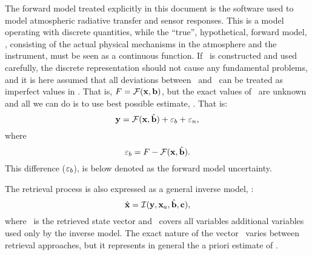 The forward model treated explicitly in this document is the software used to
model atmospheric radiative transfer and sensor responses. This is a model
operating with discrete quantities, while the ``true'', hypothetical, forward
model, \trueFrwMdl, consisting of the actual physical mechanisms in the
atmosphere and the instrument, must be seen as a continuous function. If
\FrwMdl\ is constructed and used carefully, the discrete representation should
not cause any fundamental problems, and it is here assumed that all deviations
between \trueFrwMdl\ and \FrwMdl\ can be treated as imperfect values in
\FrwMdlVct. That is, $F=\mathcal{F}(\mathbf{x},\mathbf{b})$, but the exact
values of \FrwMdlVct\ are unknown and all we can do is to use best possible
estimate, \FrwMdlVctHat. That is:
\begin{equation}
  \label{eq:fmodel2}
  \mathbf{y} = \mathcal{F}(\mathbf{x},\hat{\mathbf{b}}) + \varepsilon_b + \varepsilon_n,
\end{equation}
where 
\begin{equation}
  \label{eq:buncert}
  \varepsilon_b = F - \mathcal{F}(\mathbf{x},\hat{\mathbf{b}}).
\end{equation}
This difference ($\varepsilon_b$), is below denoted as the forward model
uncertainty. 

The retrieval process is also expressed as a general inverse model, \InvMdl:
\begin{equation}
  \label{eq:imodel}
   \hat{\mathbf{x}} = \mathcal{I}(\mathbf{y},\mathbf{x}_{a},\hat{\mathbf{b}},\mathbf{c}),
\end{equation}
where \RtrVct\ is the retrieved state vector and \InvMdlVct\ covers all
variables additional variables used only by the inverse model. The exact nature
of the vector \ varies between retrieval approaches, but it 
represents in general the a priori estimate of \SttVct.

